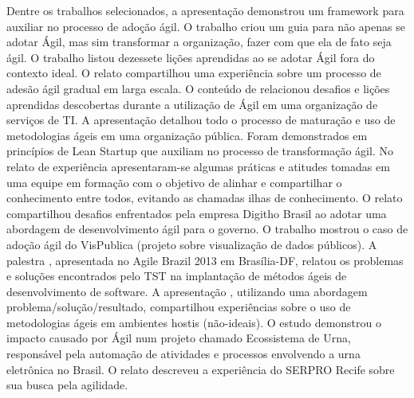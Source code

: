 Dentre os trabalhos selecionados, a apresentação\cite{Ahmed2008} demonstrou um framework para auxiliar no processo de adoção ágil. O trabalho \cite{Sahota2012} criou um guia para não apenas se adotar Ágil, mas sim transformar a organização, fazer com que ela de fato seja ágil. O trabalho \cite{Piegas2012} listou dezessete lições aprendidas ao se adotar Ágil fora do contexto ideal. O relato \cite{Parzinello2012} compartilhou uma experiência sobre um processo de adesão ágil gradual em larga escala. O conteúdo de \cite{Srinath2012} relacionou desafios e lições aprendidas descobertas durante a utilização de Ágil em uma organização de serviços de TI. A apresentação \cite{Karaj2013} detalhou todo o processo de maturação e uso de metodologias ágeis em uma organização pública. Foram demonstrados em \cite{Hui2013} princípios de Lean Startup que auxiliam no processo de transformação ágil. No relato de experiência \cite{Valerio2013} apresentaram-se algumas práticas e atitudes tomadas em uma equipe em formação com o objetivo de alinhar e compartilhar o conhecimento entre todos, evitando as chamadas ilhas de conhecimento. O relato \cite{Stefano2013} compartilhou desafios enfrentados pela empresa Digitho Brasil ao adotar uma abordagem de desenvolvimento ágil para o governo. O trabalho \cite{Rodrigues2013} mostrou o caso de adoção ágil do VisPublica (projeto sobre visualização de dados públicos). A palestra \cite{Vieira2013}, apresentada no Agile Brazil 2013 em Brasília-DF, relatou os problemas e soluções encontrados pelo TST na implantação de métodos ágeis de desenvolvimento de software. A apresentação \cite{Queiroz2013}, utilizando uma abordagem problema/solução/resultado, compartilhou experiências sobre o uso de metodologias ágeis em ambientes hostis (não-ideais). O estudo \cite{Bastos2013} demonstrou o impacto causado por Ágil num projeto chamado Ecossistema de Urna, responsável pela automação de atividades e processos envolvendo a urna eletrônica no Brasil. O relato \cite{Maciel2013} descreveu a experiência do SERPRO Recife sobre sua busca pela agilidade.

%
